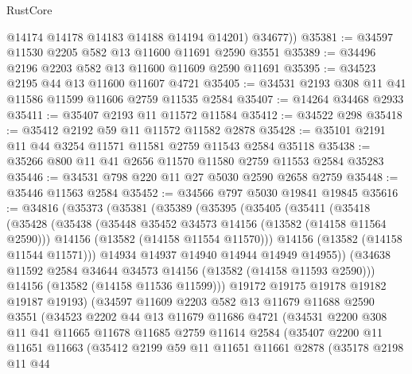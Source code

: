\begin{lexlean}{RustCore}
\begin{coremodule}
          @14174
          @14178
          @14183
          @14188
          @14194
          @14201)
        @34677))
@35381 := @34597 @11530 @2205 @582 @13 @11600 @11691 @2590 @3551
@35389 := @34496 @2196 @2203 @582 @13 @11600 @11609 @2590 @11691
@35395 := @34523 @2195 @44 @13 @11600 @11607 @4721
@35405 := @34531 @2193 @308 @11 @41 @11586 @11599 @11606 @2759 @11535 @2584
@35407 := @14264 @34468 @2933
@35411 := @35407 @2193 @11 @11572 @11584
@35412 := @34522 @298
@35418 := @35412 @2192 @59 @11 @11572 @11582 @2878
@35428 := @35101 @2191 @11 @44 @3254 @11571 @11581 @2759 @11543 @2584 @35118
@35438 := @35266 @800 @11 @41 @2656 @11570 @11580 @2759 @11553 @2584 @35283
@35446 := @34531 @798 @220 @11 @27 @5030 @2590 @2658 @2759
@35448 := @35446 @11563 @2584
@35452 := @34566 @797 @5030 @19841 @19845
@35616 := @34816
    (@35373
      (@35381
        (@35389
          (@35395
            (@35405
              (@35411
                (@35418
                  (@35428
                    (@35438
                      (@35448 @35452 @34573 @14156 (@13582 (@14158 @11564 @2590)))
                      @14156
                      (@13582 (@14158 @11554 @11570)))
                    @14156
                    (@13582 (@14158 @11544 @11571)))
                  @14934
                  @14937
                  @14940
                  @14944
                  @14949
                  @14955))
              (@34638 @11592 @2584 @34644 @34573 @14156 (@13582 (@14158 @11593 @2590)))
              @14156
              (@13582 (@14158 @11536 @11599)))
            @19172
            @19175
            @19178
            @19182
            @19187
            @19193)
          (@34597
            @11609
            @2203
            @582
            @13
            @11679
            @11688
            @2590
            @3551
            (@34523
              @2202
              @44
              @13
              @11679
              @11686
              @4721
              (@34531
                @2200
                @308
                @11
                @41
                @11665
                @11678
                @11685
                @2759
                @11614
                @2584
                (@35407
                  @2200
                  @11
                  @11651
                  @11663
                  (@35412
                    @2199
                    @59
                    @11
                    @11651
                    @11661
                    @2878
                    (@35178
                      @2198
                      @11
                      @44

\end{coremodule}
\end{lexlean}
